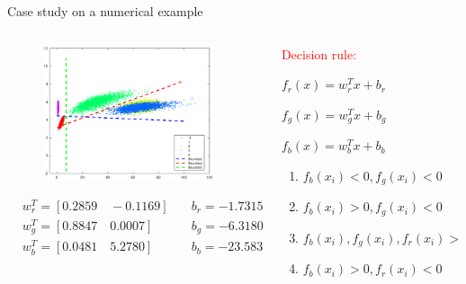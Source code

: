 \documentclass[10pt]{beamer}
\begin{document}
\begin{frame}{Case study on a numerical example}
     \begin{columns}
             \begin{column}{0.6\textwidth}
              \begin{figure}
              \centering
           \includegraphics[width=5cm]{fig/perfectR.eps}
            \end{figure}
            \begin{equation} \nonumber
            \begin{aligned}
         &w_r^T = [0.2859  \quad  -0.1169] \quad &b_r =  -1.7315 \\
         &w_g^T = [0.8847 \quad 0.0007]\quad &b_g =-6.3180  \\
         &w_b^T = [0.0481 \quad 5.2780] \quad &b_b = -23.5837  \\
           \end{aligned}
            \end{equation}
           \end{column}
        \begin{column}{0.4\textwidth}  %
        \textcolor{red}{Decision rule:}    \par
         $f_r(x)=w_r^Tx+b_r $ \par
         $f_g(x)=w_g^Tx+b_g $ \par
         $f_b(x) = w_b^Tx+b_b$ \par 
         \begin{enumerate}
             \item $f_b(x_i)<0,f_g(x_i)< 0$ 
             \item $f_b(x_i)>0,f_g(x_i)< 0$
             \item $f_b(x_i),f_g(x_i),f_r(x_i)>0$
             \item $f_b(x_i)>0,f_r(x_i)<0$
         \end{enumerate}
        \end{column}
    \end{columns}
\end{frame}
\end{document}
